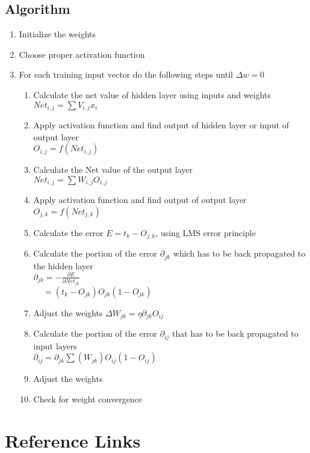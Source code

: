 \documentclass[12pt, right open]{memoir}
\begin{document}
\section{Algorithm}
\begin{enumerate}
\item Initialize the weights
\item Choose proper activation function
\item For each training input vector do the following steps until $\Delta w = 0$
\begin{enumerate}
\item Calculate the net value of hidden layer using inputs and weights \\
$ Net_{i,j} = \sum V_{i,j}x_i $
\item Apply activation function and find output of hidden layer or input of output layer \\
$ O_{i,j} = f(Net_{i,j}) $
\item Calculate the Net value of the output layer \\
$ Net_{i,j} = \sum W_{i,j} O_{i,j} $
\item Apply activation function and find output of output layer \\
$ O_{j,k} = f(Net_{j,k}) $ 
\item Calculate the error $E = t_k - O_{j,k} $, using LMS error principle
\item Calculate the portion of the error $ \partial_{jk} $ which has to be back propagated to the hidden layer \\
$ \partial_{jk} = - \frac{\partial E}{\partial Net_{jk}} $ \\
$          ~~~~~= (t_k - O_{jk}) O_{jk}(1-O_{jk}) $
\item Adjust the weights $\Delta W_{jk} = \eta \partial_{jk} O_{ij} $
\item Calculate the portion of the error $ \partial_{ij} $ that has to be back propagated to input layers \\
$ \partial_{ij} = \partial_{jk} \sum (W_{jk})O_{ij}(1-O_{ij}) $
\item Adjust the weights 
\item Check for weight convergence
\end{enumerate}
\end{enumerate}


\chapter{Reference Links}
\end{document}
